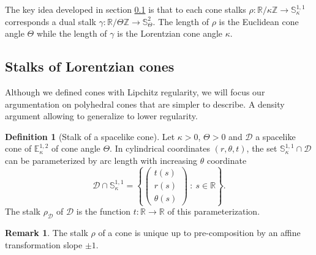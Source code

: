 \documentclass[a4paper,12pt]{article}
\def\ZZ{\mathbb{Z}}
\def\RR{\mathbb{R}}
\newcommand{\mass}[1]{{\mathbb E}^{1,2}_{#1}}
\def\SS{\mathbb{S}}
\def\Cone{\mathcal D}
\theoremstyle{definition}
\newtheorem{defi}[lem]{Definition}	%
\newtheorem*{rem}{Remark}			 %
\begin{document}
					The key idea developed in section \ref{sec:stalks} is that to each cone stalks $\rho : \RR/\kappa\ZZ \rightarrow \SS^{1,1}_\kappa$ corresponds a dual stalk $\gamma : \RR/\Theta\ZZ \rightarrow \SS^2_\Theta$. The length of $\rho$ is the Euclidean cone angle $\Theta$ while the length of $\gamma$ is the Lorentzian cone angle $\kappa$.
				
				\subsection{Stalks of Lorentzian cones} \label{sec:stalks}
					Although we defined cones with Lipchitz regularity, we will focus our argumentation on polyhedral cones that are simpler to describe. A density argument allowing to generalize to lower regularity.
					
					\begin{defi}[Stalk of a spacelike cone]
					Let $\kappa>0$, $\Theta>0$ and $\Cone$ a spacelike cone of $\mass{\kappa}$ of cone angle $\Theta$.
					In cylindrical coordinates $(r,\theta, t)$, the set $\SS^{1,1}_\kappa\cap \Cone$ can be parameterized by arc length with increasing $\theta$ coordinate
					$$\Cone\cap \SS^{1,1}_\kappa= \left\{ \left(\begin{array}{c}
						t(s)\\
						r(s)\\
						\theta(s)
					\end{array}\right) ~:~ s\in \RR\right\}.
					$$
					The stalk $\rho_{\Cone}$ of $\Cone$ is the function $ t: \RR\rightarrow \RR$ of this parameterization.
					\end{defi}
					\begin{rem}
					 The stalk $\rho$ of a cone is unique up to pre-composition by an affine transformation slope $\pm1$.
					\end{rem}
\end{document}
